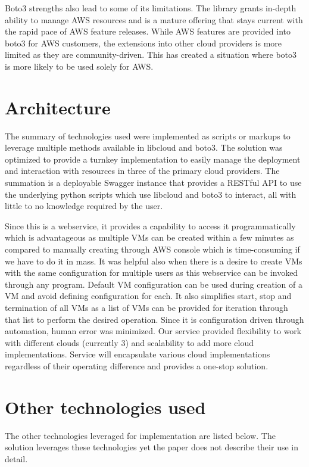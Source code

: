 Boto3 strengths also lead to some of its limitations. The library grants
in-depth ability to manage AWS resources and is a mature offering that stays
current with the rapid pace of AWS feature releases. While AWS features are
provided into boto3 for AWS customers, the extensions into other cloud
providers
is more limited as they are community-driven. This has created a situation
where
boto3 is more likely to be used solely for AWS.

\section{Architecture}

The summary of technologies used were implemented as scripts or markups to
leverage multiple methods available in libcloud and boto3. The solution was
optimized to provide a turnkey implementation to easily manage the deployment
and interaction with resources in three of the primary cloud providers. The
summation is a deployable Swagger instance that provides a RESTful API to use
the underlying python scripts which use libcloud and boto3 to interact, all
with
little to no knowledge required by the user.

Since this is a webservice, it provides a capability to access it
programmatically which is advantageous as multiple VMs can be created within a
few minutes as compared to manually creating through AWS console which is
time-consuming if we have to do it in mass. It was helpful also when there is a
desire to create VMs with the same configuration for multiple users as this
webservice can be invoked through any program. Default VM configuration can be
used during creation of a VM and avoid defining configuration for each. It also
simplifies start, stop and termination of all VMs as a list of VMs can be
provided for iteration through that list to perform the desired operation. 
Since it is configuration driven through automation, human error was minimized.
Our service provided flexibility to work with different clouds (currently 3)
and
scalability to add more cloud implementations. Service will encapsulate various
cloud implementations regardless of their operating difference and provides a
one-stop solution.

\section{Other technologies used}
The other technologies leveraged for implementation are listed below. The
solution leverages these technologies yet the paper does not describe their
use in detail.

